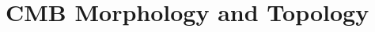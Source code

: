\chapter{CMB Morphology and Topology}\label{ch:T3}

\providecommand{\TaNsimMF}{}\renewcommand{\TaNsimMF}{300}
\providecommand{\TaPatchDeg}{}\renewcommand{\TaPatchDeg}{12.8}
\providecommand{\TaPixArcmin}{}\renewcommand{\TaPixArcmin}{1.5}
\providecommand{\TaSigZero}{}\renewcommand{\TaSigZero}{93.8}
\providecommand{\TaSigZeroSky}{}\renewcommand{\TaSigZeroSky}{104.2}
\providecommand{\TaThetaC}{}\renewcommand{\TaThetaC}{12.0}
\providecommand{\TaThetaCSky}{}\renewcommand{\TaThetaCSky}{13.4}
\providecommand{\TaVzeroOne}{}\renewcommand{\TaVzeroOne}{0.1587}
\providecommand{\TaVzeroOneSim}{}\renewcommand{\TaVzeroOneSim}{0.1585}
\providecommand{\TaChiDevPct}{}\renewcommand{\TaChiDevPct}{1.4}
\providecommand{\TaChiErrPct}{}\renewcommand{\TaChiErrPct}{0.8}
\providecommand{\TaChiPeakPatch}{}\renewcommand{\TaChiPeakPatch}{78}
\providecommand{\TaChiOne}{}\renewcommand{\TaChiOne}{73}
\providecommand{\TaChiMinusOne}{}\renewcommand{\TaChiMinusOne}{-84}
\providecommand{\TaEulerOurs}{}\renewcommand{\TaEulerOurs}{89}
\providecommand{\TaEulerSkimage}{}\renewcommand{\TaEulerSkimage}{89}
\providecommand{\TaHotSpotsSky}{}\renewcommand{\TaHotSpotsSky}{7157}
\providecommand{\TaPatchArea}{}\renewcommand{\TaPatchArea}{164}
\providecommand{\TbNsim}{}\renewcommand{\TbNsim}{300}
\providecommand{\TbA}{}\renewcommand{\TbA}{0.05}
\providecommand{\TbB}{}\renewcommand{\TbB}{0.1}
\providecommand{\TbSixA}{}\renewcommand{\TbSixA}{0.30}
\providecommand{\TbLocSzero}{}\renewcommand{\TbLocSzero}{0.298}
\providecommand{\TbLocSone}{}\renewcommand{\TbLocSone}{0.300}
\providecommand{\TbLocStwo}{}\renewcommand{\TbLocStwo}{0.299}
\providecommand{\TbNlSzero}{}\renewcommand{\TbNlSzero}{0.493}
\providecommand{\TbNlSone}{}\renewcommand{\TbNlSone}{0.443}
\providecommand{\TbNlStwo}{}\renewcommand{\TbNlStwo}{0.470}
\providecommand{\TbLocMaxShiftPct}{}\renewcommand{\TbLocMaxShiftPct}{12}
\providecommand{\TbLocAreaMaxPct}{}\renewcommand{\TbLocAreaMaxPct}{0.0}
\providecommand{\TbNlAreaMaxPct}{}\renewcommand{\TbNlAreaMaxPct}{6.0}
\providecommand{\TbErrPct}{}\renewcommand{\TbErrPct}{1.0}
\providecommand{\TbNlResNu}{}\renewcommand{\TbNlResNu}{-2.0}
\providecommand{\TbNlResPct}{}\renewcommand{\TbNlResPct}{-1.9}
\providecommand{\TbNlResSig}{}\renewcommand{\TbNlResSig}{2.8}
\providecommand{\TcPatchCount}{}\renewcommand{\TcPatchCount}{76}
\providecommand{\TcPatchPlus}{}\renewcommand{\TcPatchPlus}{38}
\providecommand{\TcPatchMinus}{}\renewcommand{\TcPatchMinus}{38}
